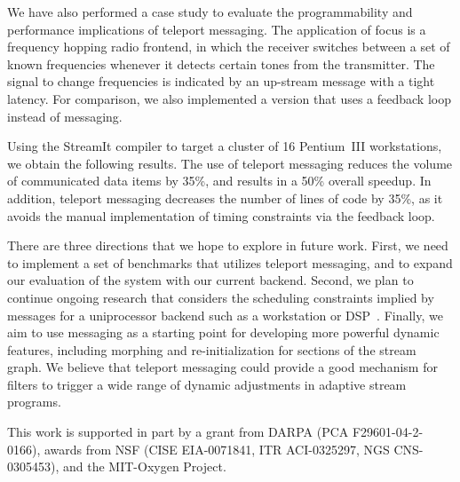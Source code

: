 \documentclass{csailabstractbook}
\begin{document}
We have also performed a case study to evaluate the programmability
and performance implications of teleport messaging.  The application
of focus is a frequency hopping radio frontend, in which the receiver
switches between a set of known frequencies whenever it detects
certain tones from the transmitter.  The signal to change frequencies
is indicated by an up-stream message with a tight latency.  For
comparison, we also implemented a version that uses a feedback loop
instead of messaging.

Using the StreamIt compiler to target a cluster of 16 Pentium~III
workstations, we obtain the following results.  The use of teleport
messaging reduces the volume of communicated data items by 35\%, and
results in a 50\% overall speedup.  In addition, teleport messaging
decreases the number of lines of code by 35\%, as it avoids the manual
implementation of timing constraints via the feedback loop.


There are three directions that we hope to explore in future work.
First, we need to implement a set of benchmarks that utilizes teleport
messaging, and to expand our evaluation of the system with our current
backend.  Second, we plan to continue ongoing research that considers
the scheduling constraints implied by messages for a uniprocessor
backend such as a workstation or DSP~\cite{karczma-thesis}.  Finally,
we aim to use messaging as a starting point for developing more
powerful dynamic features, including morphing and re-initialization
for sections of the stream graph.  We believe that teleport messaging
could provide a good mechanism for filters to trigger a wide range of
dynamic adjustments in adaptive stream programs.


This work is supported in part by a grant from DARPA (PCA
F29601-04-2-0166), awards from NSF (CISE EIA-0071841, ITR ACI-0325297,
NGS CNS-0305453), and the MIT-Oxygen Project.


\end{document}
